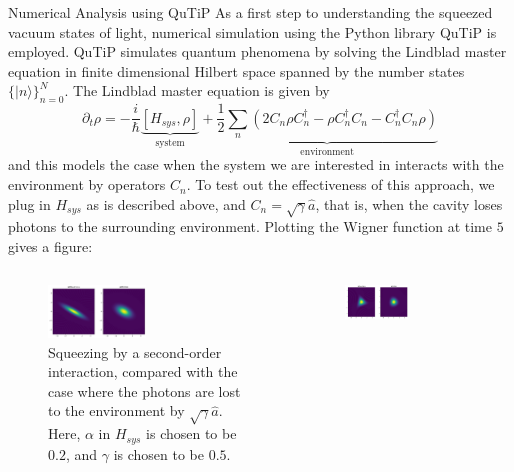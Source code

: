 \documentclass[final]{beamer}
\newcommand*\ket[1]{|{#1}\rangle}
\newlength{\colwidth}
\begin{document}
\begin{frame}[t]
\begin{columns}[t]
\begin{column}{\colwidth}
      \begin{block}{Numerical Analysis using QuTiP}
        As a first step to understanding the squeezed vacuum states of light, numerical simulation using the Python library QuTiP is employed.
        QuTiP simulates quantum phenomena by solving the Lindblad master equation in finite dimensional Hilbert space spanned by the number states $\{\ket{n}\}_{n=0}^{N}$.
        The Lindblad master equation is given by
        \[\partial_{t}\rho=-\frac{i}{\hbar}\underbrace{[H_{sys},\rho]}_{\text{system}}+\underbrace{\frac{1}{2}\sum_{n}(2C_{n}\rho C_{n}^{\dag}-\rho C_{n}^{\dag}C_{n}-C_{n}^{\dag} C_{n}\rho)}_{\text{environment}}\]
        and this models the case when the system we are interested in interacts with the environment by operators $C_{n}$.
        To test out the effectiveness of this approach, we plug in $H_{sys}$ as is described above, and $C_{n}=\sqrt{\gamma}\hat{a}$, that is, when the cavity loses photons to the surrounding environment.
        Plotting the Wigner function at time $5$ gives a figure:
        \begin{columns}
          \begin{column}{0.5\textwidth}
            \begin{figure}
              \includegraphics[width=0.5\textwidth]{squeezed_decay_0.5.png}
              \caption{Squeezing by a second-order interaction, compared with the case where the photons are lost to the environment by $\sqrt{\gamma}\hat{a}$. Here, $\alpha$ in $H_{sys}$ is chosen to be $0.2$, and $\gamma$ is chosen to be $0.5$.}
            \end{figure}
          \end{column}
          \begin{column}{0.5\textwidth}
            \begin{figure}
              \includegraphics[width=0.5\textwidth]{third_decay_0.5.png}

\end{figure}
\end{column}
\end{columns}
\end{block}
\end{column}
\end{columns}
\end{frame}
\end{document}
